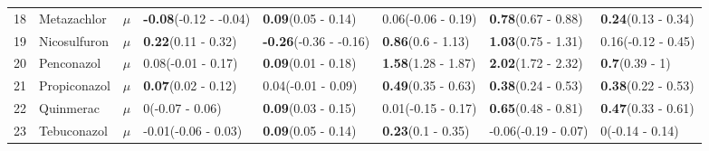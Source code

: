 \begin{longtable}{lp{2cm}p{0.7cm}p{2cm}p{2cm}p{2cm}p{2cm}p{2cm}}
  18 & Metazachlor & $\mu$ & \textbf{-0.08}\newline (-0.12 - -0.04) & \textbf{0.09}\newline (0.05 - 0.14) & 0.06\newline (-0.06 - 0.19) & \textbf{0.78}\newline (0.67 - 0.88) & \textbf{0.24}\newline (0.13 - 0.34) \\ 
  19 & Nicosulfuron & $\mu$ & \textbf{0.22}\newline (0.11 - 0.32) & \textbf{-0.26}\newline (-0.36 - -0.16) & \textbf{0.86}\newline (0.6 - 1.13) & \textbf{1.03}\newline (0.75 - 1.31) & 0.16\newline (-0.12 - 0.45) \\ 
  20 & Penconazol & $\mu$ & 0.08\newline (-0.01 - 0.17) & \textbf{0.09}\newline (0.01 - 0.18) & \textbf{1.58}\newline (1.28 - 1.87) & \textbf{2.02}\newline (1.72 - 2.32) & \textbf{0.7}\newline (0.39 - 1) \\ 
  21 & Propiconazol & $\mu$ & \textbf{0.07}\newline (0.02 - 0.12) & 0.04\newline (-0.01 - 0.09) & \textbf{0.49}\newline (0.35 - 0.63) & \textbf{0.38}\newline (0.24 - 0.53) & \textbf{0.38}\newline (0.22 - 0.53) \\ 
  22 & Quinmerac & $\mu$ & 0\newline (-0.07 - 0.06) & \textbf{0.09}\newline (0.03 - 0.15) & 0.01\newline (-0.15 - 0.17) & \textbf{0.65}\newline (0.48 - 0.81) & \textbf{0.47}\newline (0.33 - 0.61) \\ 
  23 & Tebuconazol & $\mu$ & -0.01\newline (-0.06 - 0.03) & \textbf{0.09}\newline (0.05 - 0.14) & \textbf{0.23}\newline (0.1 - 0.35) & -0.06\newline (-0.19 - 0.07) & 0\newline (-0.14 - 0.14) \\ 

\end{longtable}
